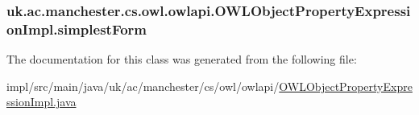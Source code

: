 \hypertarget{classuk_1_1ac_1_1manchester_1_1cs_1_1owl_1_1owlapi_1_1_o_w_l_object_property_expression_impl_a7d3eccb216021b4172f211a713573e14}{
\subsubsection[{simplest\-Form}]{ uk.\-ac.\-manchester.\-cs.\-owl.\-owlapi.\-O\-W\-L\-Object\-Property\-Expression\-Impl.\-simplest\-Form\hspace{0.3cm}{\ttfamily [private]}}}\label{classuk_1_1ac_1_1manchester_1_1cs_1_1owl_1_1owlapi_1_1_o_w_l_object_property_expression_impl_a7d3eccb216021b4172f211a713573e14}


The documentation for this class was generated from the following file\-:\begin{DoxyCompactItemize}
\item 
impl/src/main/java/uk/ac/manchester/cs/owl/owlapi/\hyperlink{_o_w_l_object_property_expression_impl_8java}{O\-W\-L\-Object\-Property\-Expression\-Impl.\-java}\end{DoxyCompactItemize}
